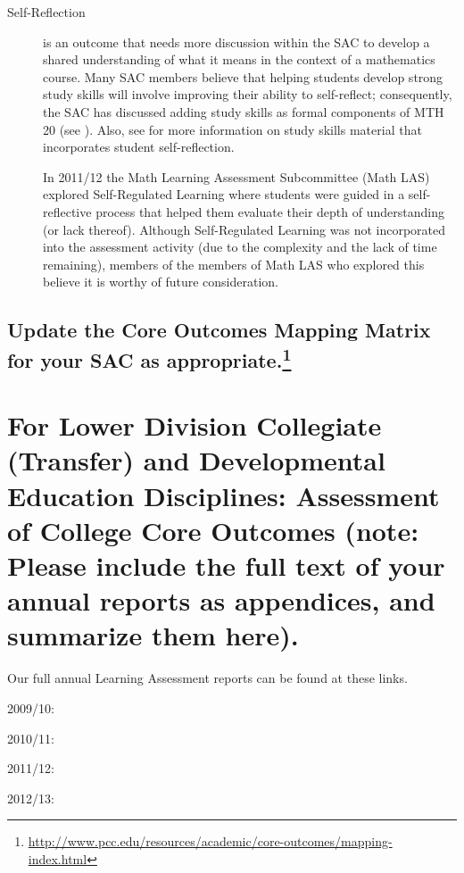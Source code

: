 \begin{description}
\item[Self-Reflection] is an outcome that needs more discussion within the SAC
  to develop a shared understanding of what it means in the context of a
  mathematics course.  Many SAC members believe that helping students develop
  strong study skills will involve improving their ability to self-reflect;
  consequently, the SAC has discussed adding study skills as formal components
  of MTH 20 (see ).  Also,  see 
  for more information on study skills material that incorporates student
  self-reflection. 

In 2011/12 the Math Learning Assessment Subcommittee (Math LAS) explored
Self-Regulated Learning where students were guided in a self-reflective process
that helped them evaluate their depth of understanding (or lack thereof).
Although Self-Regulated Learning was not incorporated into the assessment
activity (due to the complexity and the lack of time remaining), members of the
members of Math LAS who explored this believe it is worthy of future
consideration.

\end{description}

\subsection[Update the Core Outcomes Mapping Matrix for your SAC as
appropriate.]{Update the Core Outcomes Mapping Matrix for your SAC as
appropriate.\footnote{\url{http://www.pcc.edu/resources/academic/core-outcomes/mapping-index.html}}}


\section[Assessment of College Core Outcomes]{For Lower Division Collegiate
(Transfer) and Developmental Education Disciplines:  Assessment of College Core
Outcomes    (note:  Please include the full text of your annual reports as
appendices, and summarize them here).}\label{ass:sec:coreoutcomes}

Our full annual Learning Assessment reports can be found at these links. 
\begin{description}
  \item[2009/10:] \cite{annualLASreport2009}
  \item[2010/11:] \cite{annualLASreport2010}
  \item[2011/12:] \cite{annualLASreport2011}
  \item[2012/13:] \cite{annualLASreport2012}
\end{description}

